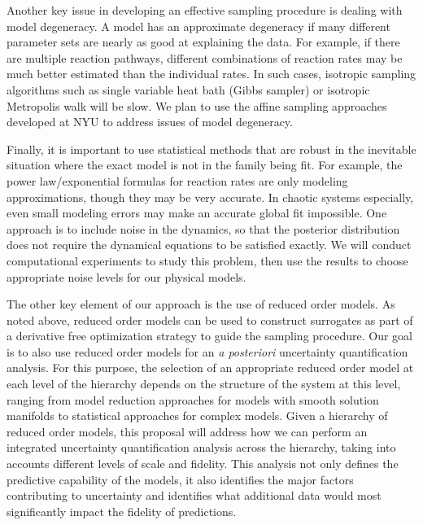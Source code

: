 \documentclass[11pt]{article}
\begin{document}
Another key issue in developing an effective sampling procedure is dealing with model degeneracy.
A model has an approximate degeneracy if many different parameter sets are nearly as good at explaining
the data.
For example, if there are multiple reaction pathways,
different combinations of reaction rates may be much
better estimated than the individual rates.
In such cases, isotropic sampling algorithms such as single variable heat bath (Gibbs sampler) or
isotropic Metropolis walk will be slow.
We plan to use the affine sampling approaches developed at NYU to address issues of model degeneracy.

Finally, it is important to use statistical methods that are robust in the inevitable situation where the
exact model is not in the family being fit.
For example, the power law/exponential formulas for reaction rates are only modeling approximations, though they
may be very accurate.
In chaotic systems especially, even small modeling errors may make an accurate global fit impossible.
One approach is to include noise in the dynamics, so that the posterior distribution does not require
the dynamical equations to be satisfied exactly.
We will conduct computational experiments to study this problem, then use the results to 
choose appropriate noise levels for our physical models.

The other key element of our approach is the use of reduced order models.  As noted above, reduced
order models can be used to construct surrogates
as part of a derivative free optimization strategy to guide the sampling procedure.
Our goal is to also use reduced order models for an {\it {a posteriori}} uncertainty quantification analysis.
For this purpose,
the selection of an appropriate reduced order model at each level of the hierarchy depends on the
structure of the system at this level,
ranging from model reduction approaches for models with smooth solution manifolds to statistical
approaches for complex models.
Given a hierarchy of reduced order models, this proposal will address how we can perform an integrated uncertainty quantification analysis 
across the hierarchy, taking into accounts different levels of scale and fidelity.
This analysis not only defines the predictive capability of the models, it also identifies
the major factors contributing to uncertainty and identifies what additional data would most significantly
impact the fidelity of predictions.
\end{document}
